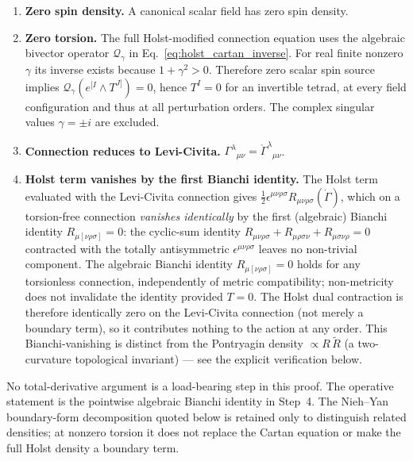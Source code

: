 \documentclass[aps,prd,twocolumn,superscriptaddress,showpacs,preprintnumbers,nofootinbib,longbibliography,floatfix]{revtex4-2}
\begin{document}
\begin{enumerate}
\item \textbf{Zero spin density.} A canonical scalar field has zero spin density.

\item \textbf{Zero torsion.} The full Holst-modified connection equation uses
the algebraic bivector operator $\mathcal Q_\gamma$ in
Eq.~\eqref{eq:holst_cartan_inverse}.  For real finite nonzero $\gamma$ its
inverse exists because $1+\gamma^2>0$.  Therefore zero scalar spin source
implies $\mathcal Q_\gamma(e^{[I}\wedge T^{J]})=0$, hence $T^I=0$ for an
invertible tetrad, at every field configuration and thus at all perturbation
orders.  The complex singular values $\gamma=\pm i$ are excluded.

\item \textbf{Connection reduces to Levi-Civita.} $\Gamma^\lambda{}_{\mu\nu}
= \mathring{\Gamma}^\lambda{}_{\mu\nu}$.

\item \textbf{Holst term vanishes by the first Bianchi identity.}
The Holst term evaluated with
the Levi-Civita connection gives $\frac{1}{2}\epsilon^{\mu\nu\rho\sigma}
R_{\mu\nu\rho\sigma}(\mathring{\Gamma})$, which on a torsion-free
connection \emph{vanishes identically} by the first (algebraic) Bianchi identity
$R_{\mu[\nu\rho\sigma]} = 0$: the cyclic-sum identity $R_{\mu\nu\rho\sigma} +
R_{\mu\rho\sigma\nu} + R_{\mu\sigma\nu\rho} = 0$ contracted with the totally
antisymmetric $\epsilon^{\mu\nu\rho\sigma}$ leaves no non-trivial component.
The algebraic Bianchi identity $R_{\mu[\nu\rho\sigma]}=0$ holds for any
torsionless connection, independently of metric compatibility; non-metricity
does not invalidate the identity provided $T=0$.
The Holst dual contraction is therefore identically zero on the Levi-Civita
connection (not merely a boundary term), so it contributes nothing to the
action at any order. This Bianchi-vanishing is distinct from the Pontryagin
density $\propto R\,\widetilde R$ (a two-curvature topological invariant) ---
see the explicit verification below.

\end{enumerate}

No total-derivative argument is a load-bearing step in this proof.  The
operative statement is the pointwise algebraic Bianchi identity in Step~4.
The Nieh--Yan boundary-form decomposition quoted below is retained only to
distinguish related densities; at nonzero torsion it does not replace the
Cartan equation or make the full Holst density a boundary term.
\end{document}
